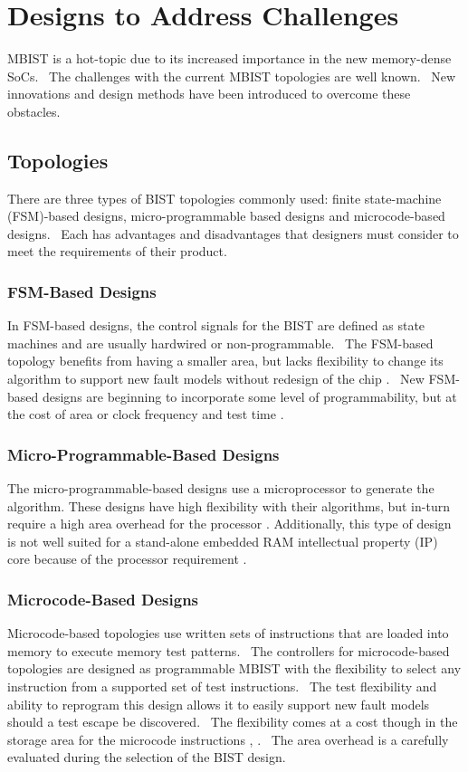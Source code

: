 \section{Designs to Address Challenges}
\label{sect:bg-designs}
MBIST is a hot-topic due to its increased importance in the new memory-dense SoCs.  The challenges with the current MBIST topologies are well known.  New innovations and design methods have been introduced to overcome these obstacles.

\subsection{Topologies}
There are three types of BIST topologies commonly used: finite state-machine (FSM)-based designs, micro-programmable based designs and microcode-based designs.  Each has advantages and disadvantages that designers must consider to meet the requirements of their product. 

\subsubsection{FSM-Based Designs}
In FSM-based designs, the control signals for the BIST are defined as state machines and are usually hardwired or non-programmable.  The FSM-based topology benefits from having a smaller area, but lacks flexibility to change its algorithm to support new fault models without redesign of the chip \cite{5692281}.  New FSM-based designs are beginning to incorporate some level of programmability, but at the cost of area \cite{4815717} or clock frequency and test time \cite{748806}.

\subsubsection{Micro-Programmable-Based Designs}
The micro-programmable-based designs use a microprocessor to generate the algorithm.  These designs have high flexibility with their algorithms, but in-turn require a high area overhead for the processor \cite{726568}.  Additionally, this type of design is not well suited for a stand-alone embedded RAM intellectual property (IP) core because of the processor requirement \cite{1584083}.

\subsubsection{Microcode-Based Designs}
Microcode-based topologies use written sets of instructions that are loaded into memory to execute memory test patterns.  The controllers for microcode-based topologies are designed as programmable MBIST with the flexibility to select any instruction from a supported set of test instructions.  The test flexibility and ability to reprogram this design allows it to easily support new fault models should a test escape be discovered.  The flexibility comes at a cost though in the storage area for the microcode instructions \cite{5692281}, \cite{114099}.  The area overhead is a carefully evaluated during the selection of the BIST design. 

